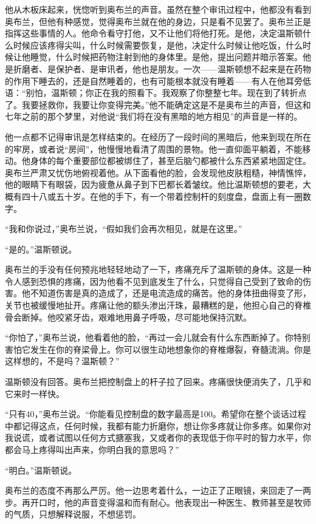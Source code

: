 他从木板床起来，恍惚听到奥布兰的声音。虽然在整个审讯过程中，他都没有看到奥布兰，但他有种感觉，觉得奥布兰就在他的身边，只是看不见罢了。奥布兰正是指挥这些事情的人。他命令看守打他，又不让他们将他打死。是他，决定温斯顿什么时候应该疼得尖叫，什么时候需要恢复，是他，决定什么时候让他吃饭，什么时候让他睡觉，什么时候把药物注射到他的身体里。是他，提出问题并暗示答案。他是折磨者、是保护者、是审讯者，他也是朋友。一次------温斯顿想不起来是在药物的作用下睡去的，还是自然睡着的，也有可能根本就没有睡着------有人在他耳旁低语：``别怕，温斯顿；你正在我的照看下。我观察了你整整七年。现在到了转折点了。我要拯救你，我要让你变得完美。''他不能确定这是不是奥布兰的声音，但这和七年之前的那个梦里，对他说``我们将在没有黑暗的地方相见''的声音是一样的。

他一点都不记得审讯是怎样结束的。在经历了一段时间的黑暗后，他来到现在所在的牢房，或者说``房间''，他慢慢地看清了周围的景物。他一直仰面平躺着，不能移动。他身体的每个重要部位都被绑住了，甚至后脑勺都被什么东西紧紧地固定住。奥布兰严肃又忧伤地俯视着他。从下面看他的脸，会发现他皮肤粗糙，神情憔悴，他的眼睛下有眼袋，因为疲惫从鼻子到下巴都长着皱纹。他比温斯顿想的要老，大概有四十八或五十岁。在他的手下，有一个带着控制杆的刻度盘，盘面上有一圈数字。

``我和你说过，''奥布兰说，``假如我们会再次相见，就是在这里。''

``是的。''温斯顿说。

奥布兰的手没有任何预兆地轻轻地动了一下，疼痛充斥了温斯顿的身体。这是一种令人感到恐惧的疼痛，因为他看不见到底发生了什么，只觉得自己受到了致命的伤害。他不知道伤害是真的造成了，还是电流造成的痛苦。他的身体扭曲得变了形，关节也被缓慢地扯开。疼痛让他的额头渗出汗珠，最糟糕的是，他担心自己的脊椎骨会断掉。他咬紧牙齿，艰难地用鼻子呼吸，尽可能地保持沉默。

``你怕了，''奥布兰说，他看着他的脸，``再过一会儿就会有什么东西断掉了。你特别害怕它发生在你的脊梁骨上。你可以很生动地想象你的脊椎爆裂，脊髓流淌。你是这样想的，不是吗？温斯顿？''

温斯顿没有回答。奥布兰把控制盘上的杆子拉了回来。疼痛很快便消失了，几乎和它来时一样快。

``只有40，''奥布兰说。``你能看见控制盘的数字最高是100。希望你在整个谈话过程中都记得这点，任何时候，我都有能力折磨你，想让你多疼就让你多疼。如果你对我说谎，或者试图以任何方式搪塞我，又或者你的表现低于你平时的智力水平，你都会马上疼得叫出声来，你明白我的意思吗？''

``明白。''温斯顿说。

奥布兰的态度不再那么严厉。他一边思考着什么，一边正了正眼镜，来回走了一两步。再开口时，他的声音变得温和而有耐心。他表现出一种医生、教师甚至是牧师的气质，只想解释说服，不想惩罚。

